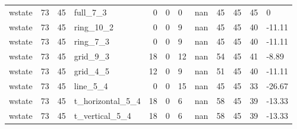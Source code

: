 \begin{longtable}{lrrlrrllrrll}
wstate & 73 & 45 & full\_7\_3 & 0 & 0 & 0 & nan & 45 & 45 & 45 & 0 \\
wstate & 73 & 45 & ring\_10\_2 & 0 & 0 & 9 & nan & 45 & 45 & 40 & -11.11 \\
wstate & 73 & 45 & ring\_7\_3 & 0 & 0 & 9 & nan & 45 & 45 & 40 & -11.11 \\
wstate & 73 & 45 & grid\_9\_3 & 18 & 0 & 12 & nan & 54 & 45 & 41 & -8.89 \\
wstate & 73 & 45 & grid\_4\_5 & 12 & 0 & 9 & nan & 51 & 45 & 40 & -11.11 \\
wstate & 73 & 45 & line\_5\_4 & 0 & 0 & 15 & nan & 45 & 45 & 33 & -26.67 \\
wstate & 73 & 45 & t\_horizontal\_5\_4 & 18 & 0 & 6 & nan & 58 & 45 & 39 & -13.33 \\
wstate & 73 & 45 & t\_vertical\_5\_4 & 18 & 0 & 6 & nan & 58 & 45 & 39 & -13.33 \\
\end{longtable}
